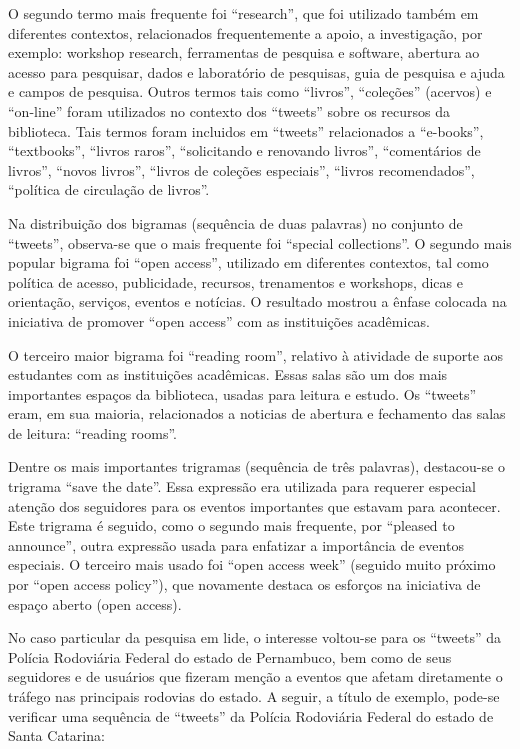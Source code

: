 O segundo termo mais frequente foi ``research'', que foi utilizado também em diferentes contextos, relacionados frequentemente a apoio, a investigação, por exemplo: workshop research, ferramentas de pesquisa e software, abertura ao acesso para pesquisar, dados e laboratório de pesquisas, guia de pesquisa e ajuda e campos de pesquisa. Outros termos tais como “livros”, “coleções” (acervos) e “on-line” foram utilizados no contexto dos ``tweets'' sobre os recursos da biblioteca. Tais termos foram incluidos em ``tweets'' relacionados a “e-books”, “textbooks”, “livros raros”, “solicitando e renovando livros”, “comentários de livros”, “novos livros”, “livros de coleções especiais”, “livros recomendados”, “política de circulação de livros”. 

Na distribuição dos bigramas (sequência de duas palavras) no conjunto de ``tweets'', observa-se que o mais frequente foi “special collections”.
O segundo mais popular bigrama foi “open access”, utilizado em diferentes contextos, tal como política de acesso, publicidade, recursos, trenamentos e workshops, dicas e orientação, serviços, eventos e notícias. O resultado mostrou a ênfase colocada na iniciativa de promover “open access” com as instituições acadêmicas.

O terceiro maior bigrama foi “reading room”, relativo à atividade de suporte aos estudantes com as instituições acadêmicas. Essas salas são um dos mais importantes espaços da biblioteca, usadas para leitura e estudo. Os ``tweets'' eram, em sua maioria, relacionados a noticias de abertura e fechamento das salas de leitura: “reading rooms”.

Dentre os mais importantes trigramas (sequência de três palavras), destacou-se o trigrama “save the date”. Essa expressão era utilizada para requerer especial atenção dos seguidores para os eventos importantes que estavam para acontecer. Este trigrama é seguido, como o segundo mais frequente, por “pleased to announce”, outra expressão usada para enfatizar a importância de eventos especiais. O terceiro mais usado foi “open access week” (seguido muito próximo por “open access policy”), que novamente destaca os esforços na iniciativa de espaço aberto (open access). 

\pagebreak

No caso particular da pesquisa em lide, o interesse voltou-se para os ``tweets'' da Polícia Rodoviária Federal do estado de Pernambuco, bem como de seus seguidores e de usuários que fizeram menção a eventos que afetam diretamente o tráfego nas principais rodovias do estado. A seguir, a título de exemplo, pode-se verificar uma sequência de ``tweets'' da Polícia Rodoviária Federal do estado de Santa Catarina:

